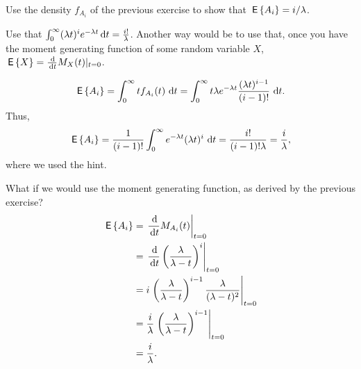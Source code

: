 \begin{exercise}
  Use the density $f_{A_i}$ of the previous exercise to show that $\,\mathsf{E}\left\{A_i\right\}=i/\lambda$. 
  \begin{hint}
Use that
    $\int_0^\infty (\lambda t)^i e^{- \lambda t} \,\text{d}t =
    \frac{i!}\lambda$.
    Another way would be to use that, once you have the moment
    generating function of some random variable $X$,
    $\E X = \frac{\d}{\d t} M_X(t) |_{t=0}$. 
  \end{hint}
\begin{solution}
  \begin{equation*}
\,\mathsf{E}\left\{A_i\right\} = \int_0^\infty t f_{A_i} (t) \, \,\text{d}t  = 
\int_0^\infty t  \lambda e^{-\lambda t} \frac{(\lambda t)^{i-1}}{(i-1)!}\, \,\text{d}t.
  \end{equation*}
Thus, 
  \begin{equation*}
\,\mathsf{E}\left\{A_i\right\} = \frac{1}{(i-1)!} \int_0^\infty   e^{-\lambda t} (\lambda t)^i\,\,\text{d}t = \frac{i!}{(i-1)!\lambda}=\frac{i}\lambda,
  \end{equation*}
  where we used the hint.

What if we would use the moment generating function, as derived by the previous exercise?
\begin{equation*}
  \begin{split}
    \E{A_i} 
&= \left.\frac{\d}{\d t} M_{A_i}(t)\right|_{t=0} \\
&= \left.\frac{\d}{\d t} \left(\frac{\lambda}{\lambda-t}\right)^i\right|_{t=0} \\
&= i \left.\left(\frac{\lambda}{\lambda-t}\right)^{i-1}\frac{\lambda}{(\lambda-t)^2}\right|_{t=0} \\
&= \frac i\lambda \left.\left(\frac{\lambda}{\lambda-t}\right)^{i-1}\right|_{t=0} \\
&= \frac i\lambda.
  \end{split}
\end{equation*}


\end{solution}
\end{exercise}

\begin{comment}
\begin{exercise}
  Assume a timer fires at times $0=T_0<T_1<T_2< \cdots$, such that
  $T_{k}-T_{k-1}\sim\exp(\lambda)$. Define
  $N(t) = \sum_{k=0}^\infty k \1{T_k \leq t < T_{k+1}}$, 
What is the
  distribution of $N(t)$?
\begin{solution}
$N(t) \sim \text{P}(\lambda t)$. 
\end{solution}
\end{exercise}
\end{comment}
  
